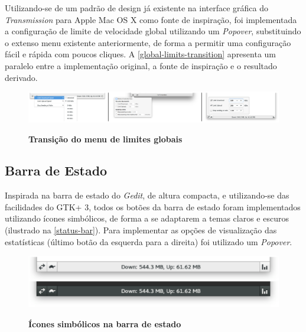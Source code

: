 Utilizando-se de um padrão de design já existente na interface gráfica do
\textit{Transmission} para Apple Mac OS X como fonte de inspiração, foi
implementada a configuração de limite de velocidade global utilizando um
\textit{Popover}, substituindo o extenso menu existente anteriormente, de forma
a permitir uma configuração fácil e rápida com poucos cliques. A
\autoref{global-limits-transition} apresenta um paralelo entre a implementação
original, a fonte de inspiração e o resultado derivado.

\begin{figure}[!ht]
  \begin{center}
    \caption{\textbf{Transição do menu de limites globais}}
    \includegraphics [width=\textwidth]{image/global-limits-transition.eps}
    \label{global-limits-transition}
  \end{center}
\end{figure}

\subsection{Barra de Estado}

Inspirada na barra de estado do \textit{Gedit}, de altura compacta, e
utilizando-se das facilidades do GTK+ 3, todos os botões da barra de estado
foram implementados utilizando ícones simbólicos, de forma a se adaptarem a
temas claros e escuros (ilustrado na \autoref{status-bar}). Para implementar as
opções de visualização das estatísticas (último botão da esquerda para a
direita) foi utilizado um \textit{Popover}.

\begin{figure}[!ht]
  \begin{center}
    \caption{\textbf{Ícones simbólicos na barra de estado}}
    \includegraphics [width=\textwidth]{image/status-bar.eps}
    \label{status-bar}
  \end{center}
\end{figure}

